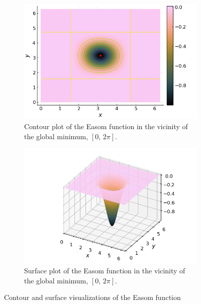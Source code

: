 \begin{figure}[ht!]
\begin{subfigure}[b]{0.45\textwidth}
    \includegraphics[width=\textwidth]
      {img/test_functions/easom_contour_closeup.png}
    \caption{
      Contour plot of the Easom function in the vicinity of the global minimum,
      \([0,\, 2\pi]\).
    }
    \label{fig:app:test:easom:contour:closeup}
  \end{subfigure}
  \hfill
  \begin{subfigure}[b]{0.45\textwidth}
    \centering
    \includegraphics[width=\textwidth]
      {img/test_functions/easom_surface_closeup.png}
    \caption{
      Surface plot of the Easom function in the vicinity of the global minimum,
      \([0,\, 2\pi]\).
    }
    \label{fig:app:test:easom:surface:closeup}
  \end{subfigure}
  \caption{Contour and surface visualizations of the Easom function}
  \label{fig:app:test:easom}
\end{figure}
